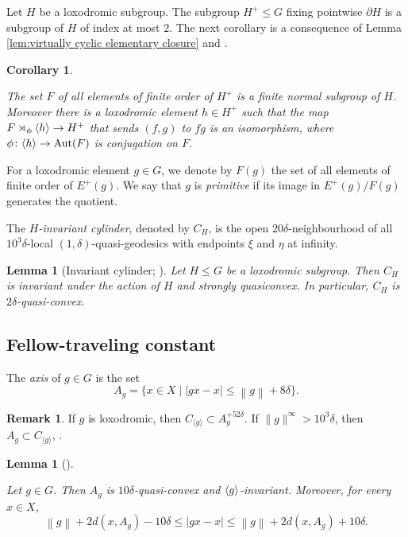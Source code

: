 \documentclass[leqno,a4paper,10pt]{amsart}
\theoremstyle{plain}
\newtheorem{lem}[thm]{Lemma}
\newtheorem{cor}[thm]{Corollary}
\theoremstyle{definition}
\newtheorem{rem}[thm]{Remark}
\theoremstyle{remark}
\let\le\leqslant
\DeclareMathOperator{\Aut}{Aut}
\newcommand{\group}[1]{
	\mathchoice%
	{\left\langle #1\right\rangle}%
	{\langle #1\rangle}%
	{\langle #1\rangle}%
	{\langle #1\rangle}%
}
\newcommand{\sdirect}[3]{%
	#1 \rtimes_{#2} #3
}
\newcommand{\tlen}[1]{
	\left\| #1\right\|
}
\begin{document}
Let $H$ be a loxodromic subgroup. 
The subgroup $H^+\le G$ fixing pointwise $\partial H$ is a subgroup of $H$ of index at most $2$. The next corollary is a consequence of Lemma \ref{lem:virtually cyclic elementary closure} and \cite[Lemma~4.1]{wall_poincare_1967}.

\begin{cor}
	
	\label{lem:loxodromic-subgroups-f-by-z}
	
The set $F$ of all elements of finite order of $H^+$ is a finite normal subgroup of $H$. Moreover there is a loxodromic element $h\in H^+$ such that the map $\sdirect{F}{\phi}{\group{h}} \to H^+$ that sends $(f,g)$ to $fg$ is an isomorphism, where $\phi\colon \group{h}\to \Aut(F)$ is conjugation on $F$.
	
\end{cor}

For a loxodromic element $g\in G$, we denote by $F(g)$ the set of all elements of finite order of $E^+(g)$. We say that $g$ is \emph{primitive} if its image in $E^+(g)/F(g)$ generates the quotient.

The \emph{$H$-invariant cylinder}, denoted by $C_H$, is the open $20\delta$-neighbourhood of all $10^3 \delta$-local  $(1, \delta)$-quasi-geodesics with endpoints $\xi$ and $\eta$ at infinity.

\begin{lem}[{Invariant cylinder; \cite[Lemma~3.13]{coulon_partial_2016}}]
	\label{L: invariant cylinder}
	Let $H\le G$ be a loxodromic subgroup. Then $C_H$ is invariant under the action of $H$ and strongly quasiconvex. In particular, $C_H$ is $2\delta$-quasi-convex. 
\end{lem}



\subsection{Fellow-traveling constant} 

The \emph{axis} of $g\in G$ is the set 
$$
A_g = \{x \in X \mid |gx-x|\le \tlen{g}+8\delta\}.
$$
\begin{rem}\label{R:axis-cylinder} If $g$ is loxodromic, then $ C_{\langle g\rangle}\subset A_g^{+52\delta}$. If  $\|g\|^{\infty}>10^3 \delta$, then $A_g\subset  C_{\langle g\rangle}$, \cite[Lemma 2.33]{coulon_geometry_2014}.
\end{rem}

\begin{lem}[]
	
	\label{lem:axis-isometry} 
	
	Let $g\in G$. Then $A_g$ is $10\delta$-quasi-convex and $\group{g}$-invariant. Moreover, for every $x\in X$,
	$$\tlen{g}+2d(x,A_g)-10\delta \le |gx-x| \le \tlen{g}+2d(x,A_g)+10\delta.$$
	
\end{lem}
\end{document}
